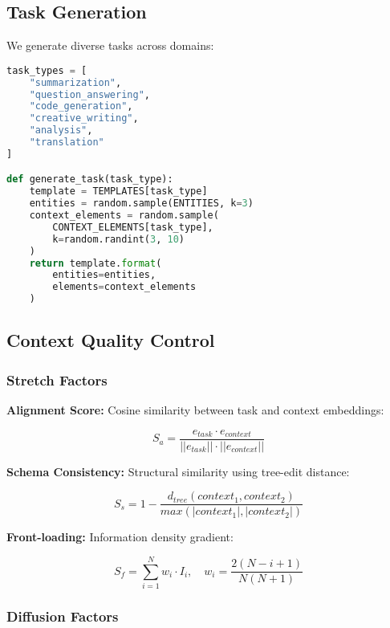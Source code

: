 \documentclass[conference]{IEEEtran}
\begin{document}
\subsection{Task Generation}

We generate diverse tasks across domains:

\begin{lstlisting}[language=Python, basicstyle=\small]
task_types = [
    "summarization",
    "question_answering", 
    "code_generation",
    "creative_writing",
    "analysis",
    "translation"
]

def generate_task(task_type):
    template = TEMPLATES[task_type]
    entities = random.sample(ENTITIES, k=3)
    context_elements = random.sample(
        CONTEXT_ELEMENTS[task_type], 
        k=random.randint(3, 10)
    )
    return template.format(
        entities=entities,
        elements=context_elements
    )
\end{lstlisting}

\subsection{Context Quality Control}

\subsubsection{Stretch Factors}

\textbf{Alignment Score:} Cosine similarity between task and context embeddings:

\begin{equation}
S_a = \frac{e_{task} \cdot e_{context}}{||e_{task}|| \cdot ||e_{context}||}
\end{equation}

\textbf{Schema Consistency:} Structural similarity using tree-edit distance:

\begin{equation}
S_s = 1 - \frac{d_{tree}(context_1, context_2)}{max(|context_1|, |context_2|)}
\end{equation}

\textbf{Front-loading:} Information density gradient:

\begin{equation}
S_f = \sum_{i=1}^{N} w_i \cdot I_i, \quad w_i = \frac{2(N-i+1)}{N(N+1)}
\end{equation}

\subsubsection{Diffusion Factors}
\end{document}
